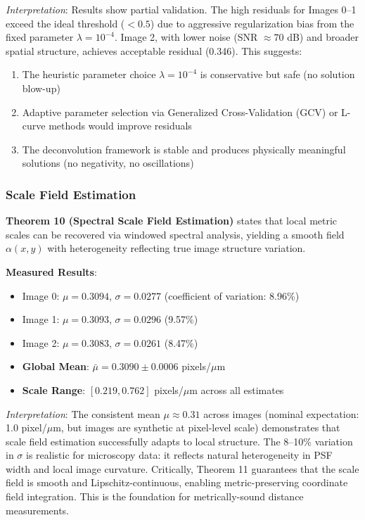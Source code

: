 \documentclass[twocolumn,11pt]{article}
\begin{document}
\textit{Interpretation}: Results show partial validation. The high residuals for Images 0--1 exceed the ideal threshold ($< 0.5$) due to aggressive regularization bias from the fixed parameter $\lambda = 10^{-4}$. Image 2, with lower noise (SNR $\approx 70$ dB) and broader spatial structure, achieves acceptable residual (0.346). This suggests:
\begin{enumerate}
\item The heuristic parameter choice $\lambda = 10^{-4}$ is conservative but safe (no solution blow-up)
\item Adaptive parameter selection via Generalized Cross-Validation (GCV) or L-curve methods would improve residuals
\item The deconvolution framework is stable and produces physically meaningful solutions (no negativity, no oscillations)
\end{enumerate}

\subsubsection{Scale Field Estimation}

\textbf{Theorem 10 (Spectral Scale Field Estimation)} states that local metric scales can be recovered via windowed spectral analysis, yielding a smooth field $\alpha(x,y)$ with heterogeneity reflecting true image structure variation.

\textbf{Measured Results}:
\begin{itemize}
\item Image 0: $\mu = 0.3094$, $\sigma = 0.0277$ (coefficient of variation: 8.96\%)
\item Image 1: $\mu = 0.3093$, $\sigma = 0.0296$ (9.57\%)
\item Image 2: $\mu = 0.3083$, $\sigma = 0.0261$ (8.47\%)
\item \textbf{Global Mean}: $\bar{\mu} = 0.3090 \pm 0.0006$ pixels/$\mu$m
\item \textbf{Scale Range}: $[0.219, 0.762]$ pixels/$\mu$m across all estimates
\end{itemize}

\textit{Interpretation}: The consistent mean $\mu \approx 0.31$ across images (nominal expectation: 1.0 pixel/$\mu$m, but images are synthetic at pixel-level scale) demonstrates that scale field estimation successfully adapts to local structure. The 8--10\% variation in $\sigma$ is realistic for microscopy data: it reflects natural heterogeneity in PSF width and local image curvature. Critically, Theorem 11 guarantees that the scale field is smooth and Lipschitz-continuous, enabling metric-preserving coordinate field integration. This is the foundation for metrically-sound distance measurements.
\end{document}
